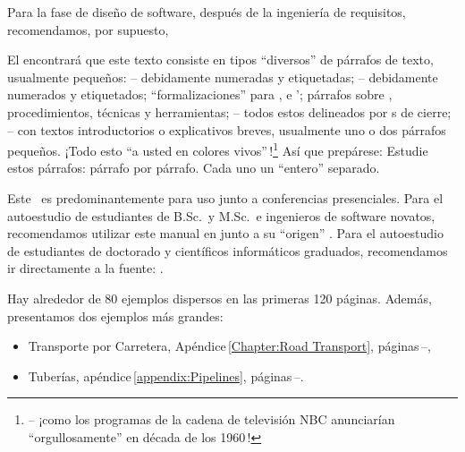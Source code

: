 \begynd
\pind Para la fase de diseño de software, después de la ingeniería de requisitos,
\pind recomendamos, por supuesto, \cite[
      ols.\,1--2]{TheSEBook1,TheSEBook2} 
\afslut

\label{The Structuring of The Text}

\begynd
\pind El  encontrará que este texto consiste en
      tipos ``diversos'' de párrafos de texto, usualmente pequeños:
\begynd
\pind {} -- debidamente numeradas y etiquetadas;
\pind {} -- debidamente numerados y etiquetados;
\pind ``formalizaciones'' para ,  e 
       ';
\pind párrafos sobre , procedimientos, técnicas y herramientas;
\pind -- todos estos delineados por {\dbsquare}s de cierre;
\pind -- con textos introductorios o explicativos breves, usualmente uno o dos párrafos pequeños.
\afslut
\pind ¡Todo esto  \textsf{``a usted en colores
  vivos''\,!}\footnote{\LLLL -- ¡como los programas de la cadena de televisión \textsf{NBC}
  anunciarían ``orgullosamente'' en década de los 1960\,!}
\pind Así que prepárese:
\begynd
\pind Estudie estos párrafos: párrafo por párrafo.
\pind Cada uno  un ``entero'' separado.
\afslut
\afslut


\label{sec:Used for Self-Study}

\begynd
\pind Este \primer\ es predominantemente para uso junto a conferencias presenciales.
\pind Para el autoestudio de estudiantes de B.Sc.\ y M.Sc.\ e
      ingenieros de software novatos, recomendamos utilizar este manual en
      junto a su ``origen'' \cite{BjornerMonograph2020}.
\pind Para el autoestudio de estudiantes de doctorado y científicos
      informáticos graduados, recomendamos ir directamente a la fuente:
      \cite{BjornerMonograph2020}.   
\afslut

\label{primer:Two Examples}

\begynd
\pind Hay alrededor de 80 ejemplos dispersos en las primeras 120 páginas.
\pind Además, presentamos dos ejemplos más grandes:
\afslut
\begin{itemize}
\item \textsf{Transporte por Carretera}, Apéndice\,\ref{Chapter:Road
        Transport}, páginas\,\pageref{Chapter:Road Transport}--\pageref{p-ch:Road Transport.n}, 
\item \textsf{Tuberías},
      apéndice\,\ref{appendix:Pipelines}, páginas\,\pageref{appendix:Pipelines}--\pageref{appendix:Pipelines.n}. 
\end{itemize}

